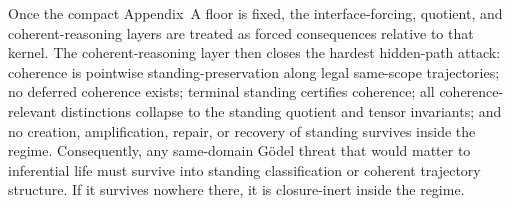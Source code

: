 \begin{remark}
Once the compact Appendix~A floor is fixed, the interface-forcing, quotient, and coherent-reasoning layers are treated as forced consequences relative to that kernel. The coherent-reasoning layer then closes the hardest hidden-path attack: coherence is pointwise standing-preservation along legal same-scope trajectories; no deferred coherence exists; terminal standing certifies coherence; all coherence-relevant distinctions collapse to the standing quotient and tensor invariants; and no creation, amplification, repair, or recovery of standing survives inside the regime. Consequently, any same-domain G\"odel threat that would matter to inferential life must survive into standing classification or coherent trajectory structure. If it survives nowhere there, it is closure-inert inside the regime.
\end{remark}
